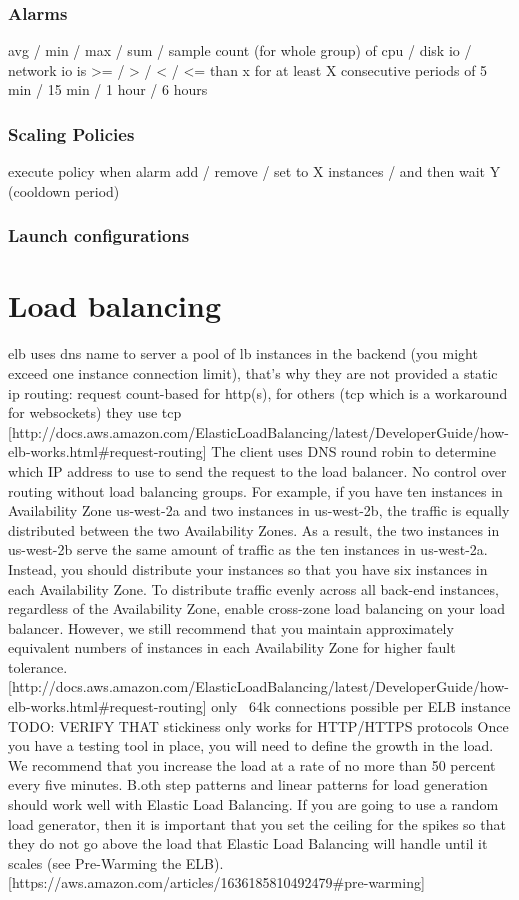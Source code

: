 \documentclass{uvamscse}
\begin{document}
  \subsubsection{Alarms}
  avg / min / max / sum / sample count (for whole group)
  of cpu / disk io / network io
  is >= / > / < / <= than x %
  for at least X consecutive periods of 5 min / 15 min / 1 hour / 6 hours
  \subsubsection{Scaling Policies}
  execute policy when alarm
  add / remove / set to   X   instances / %
  and then wait Y (cooldown period)

  \subsubsection{Launch configurations}

\section{Load balancing}
  elb uses dns name to server a pool of lb instances in the backend (you might exceed one instance connection limit), that's why they are not provided a static ip
  routing: request count-based for http(s), for others (tcp which is a workaround for websockets) they use tcp [http://docs.aws.amazon.com/ElasticLoadBalancing/latest/DeveloperGuide/how-elb-works.html\#request-routing]
  The client uses DNS round robin to determine which IP address to use to send the request to the load balancer. No control over routing without load balancing groups.
  For example, if you have ten instances in Availability Zone us-west-2a and two instances in us-west-2b, the traffic is equally distributed between the two Availability Zones. As a result, the two instances in us-west-2b serve the same amount of traffic as the ten instances in us-west-2a. Instead, you should distribute your instances so that you have six instances in each Availability Zone.
  To distribute traffic evenly across all back-end instances, regardless of the Availability Zone, enable cross-zone load balancing on your load balancer. However, we still recommend that you maintain approximately equivalent numbers of instances in each Availability Zone for higher fault tolerance.
  [http://docs.aws.amazon.com/ElasticLoadBalancing/latest/DeveloperGuide/how-elb-works.html\#request-routing]
  only ~64k connections possible per ELB instance TODO: VERIFY THAT
  stickiness only works for HTTP/HTTPS protocols
  Once you have a testing tool in place, you will need to define the growth in the load. We recommend that you increase the load at a rate of no more than 50 percent every five minutes. B.oth step patterns and linear patterns for load generation should work well with Elastic Load Balancing. If you are going to use a random load generator, then it is important that you set the ceiling for the spikes so that they do not go above the load that Elastic Load Balancing will handle until it scales (see Pre-Warming the ELB).
  [https://aws.amazon.com/articles/1636185810492479\#pre-warming]
\end{document}
